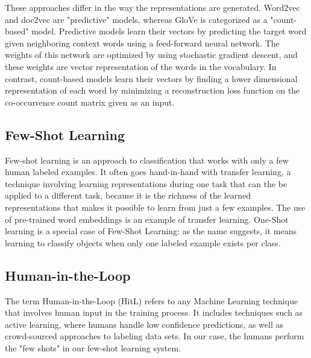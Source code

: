 \documentclass[11pt,letterpaper]{article}
\begin{document}
These approaches differ in the way the representations are generated.  Word2vec and doc2vec are "predictive" models, whereas GloVe is categorized as a "count-based" model.  Predictive models learn their vectors by predicting the target word given neighboring context words using a feed-forward neural network. The weights of this network are optimized by using stochastic gradient descent, and these weights are vector representation of the words in the vocabulary. In contrast, count-based models learn their vectors by finding a lower dimensional representation of each word by minimizing a reconstruction loss function on the co-occurrence count matrix given as an input.

\subsection*{Few-Shot Learning}
Few-shot learning is an approach to classification that works with only a few human labeled examples. It often goes hand-in-hand with transfer learning, a technique involving learning representations during one task that can the be applied to a different task, because it is the richness of the learned representations that makes it possible to learn from just a few examples. The use of pre-trained word embeddings is an example of transfer learning. One-Shot learning is a special case of Few-Shot Learning: as the name suggests, it means learning to classify objects when only one labeled example exists per class.

\subsection*{Human-in-the-Loop}
The term Human-in-the-Loop (HitL) refers to any Machine Learning technique that involves human input in the training process. It includes techniques such as active learning, where humans handle low confidence predictions, as well as crowd-sourced approaches to labeling data sets. In our case, the humans perform the "few shots" in our few-shot learning system.
\end{document}
